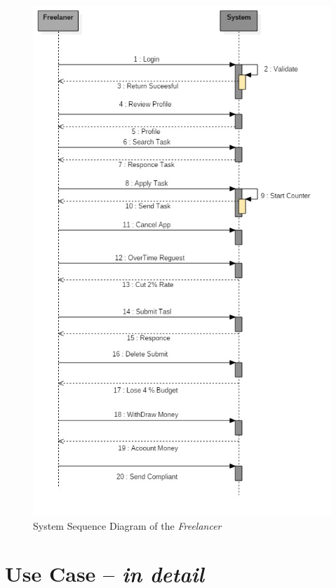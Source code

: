 \documentclass{article}
\begin{document}
\begin{figure}[ht!]
\centering
\includegraphics[width=128mm]{SystemSequanceFreelancer}
\caption{System Sequence Diagram of the \textit{Freelancer}}
\end{figure}



\section{Use Case -- \textit{in detail}}
\end{document}
